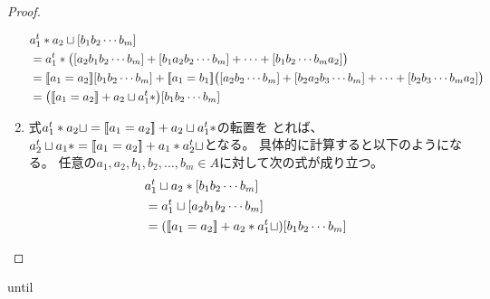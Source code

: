\begin{proof}
\begin{enumerate}
				\begin{equation*}\begin{split} %
					& a_1^t* a_2\sqcup [b_1b_2\cdots b_m] \\
					&= a_1^t* \bigl([a_2b_1b_2\cdots b_m] 
						+ [b_1a_2b_2\cdots b_m] + \cdots + [b_1b_2\cdots b_ma_2]\bigr)\\
					&= \jump{a_1=a_2}[b_1b_2\cdots b_m]
						+ \jump{a_1=b_1}\bigl([a_2b_2\cdots b_m]+[b_2a_2b_3\cdots b_m]
						+ \cdots + [b_2b_3\cdots b_ma_2]\bigr) \\
					&= \bigl(\jump{a_1=a_2} + a_2\sqcup a_1^t*\bigr)[b_1b_2\cdots b_m] \\
				\end{split}\end{equation*} %
				\item 式$a_1^t*a_2\sqcup=[\![a_1=a_2]\!]+a_2\sqcup a_1^t*$の転置を
				とれば、$a_2^t\sqcup a_1*=[\![a_1=a_2]\!]+a_1*a_2^t\sqcup$となる。
				具体的に計算すると以下のようになる。
				任意の$a_1,a_2,b_1,b_2,\dots,b_m\in A$に対して次の式が成り立つ。
				\begin{equation*}\begin{split} %
					& a_1^t\sqcup a_2* [b_1b_2\cdots b_m] \\
					&= a_1^t\sqcup [a_2b_1b_2\cdots b_m] \\
					&= (\jump{a_1=a_2} + a_2* a_1^t\sqcup) [b_1b_2\cdots b_m] \\
				\end{split}\end{equation*} %
			\end{enumerate} %
		\end{proof} %
		
		until

